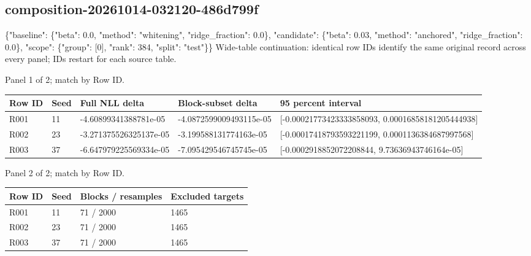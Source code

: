 \documentclass[10pt]{article}
\begin{document}
\subsection{composition-20261014-032120-486d799f}
\{"baseline": \{"beta": 0.0, "method": "whitening", "ridge\_fraction": 0.0\}, "candidate": \{"beta": 0.03, "method": "anchored", "ridge\_fraction": 0.0\}, "scope": \{"group": [0], "rank": 384, "split": "test"\}\}
Wide-table continuation: identical row IDs identify the same original record across every panel; IDs restart for each source table.
\par\noindent Panel 1 of 2; match by Row ID.
{\scriptsize\setlength{\tabcolsep}{2pt}
\begin{longtable}{p{}p{}p{}p{}p{}}
Row ID & Seed & Full NLL delta & Block-subset delta & 95 percent interval \\
\hline\endhead
R001 & 11 & -4.60899341388781e-05 & -4.0872599009493115e-05 & [-0.00021773423333858093, 0.00016858181205444938] \\
R002 & 23 & -3.271375526325137e-05 & -3.199588131774163e-05 & [-0.00017418793593221199, 0.0001136384687997568] \\
R003 & 37 & -6.647979225569334e-05 & -7.095429546745745e-05 & [-0.0002918852072208844, 9.73636943746164e-05] \\
\end{longtable}}
\par\noindent Panel 2 of 2; match by Row ID.
{\scriptsize\setlength{\tabcolsep}{2pt}
\begin{longtable}{p{}p{}p{}p{}}
Row ID & Seed & Blocks / resamples & Excluded targets \\
\hline\endhead
R001 & 11 & 71 / 2000 & 1465 \\
R002 & 23 & 71 / 2000 & 1465 \\
R003 & 37 & 71 / 2000 & 1465 \\
\end{longtable}}
\end{document}
